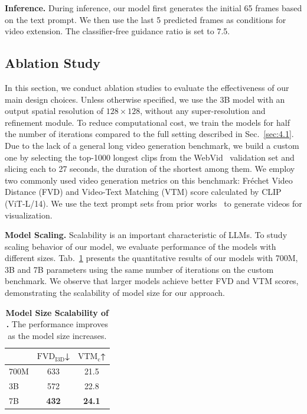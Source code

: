 \textbf{Inference.}
During inference, our model first generates the initial 65 frames based on the text prompt. We then use the last 5 predicted frames as conditions for video extension. The classifier-free guidance ratio is set to 7.5.


\subsection{Ablation Study}
In this section, we conduct ablation studies to evaluate the effectiveness of our main design choices. Unless otherwise specified, we use the 3B model with an output spatial resolution of $128\times 128$, without any super-resolution  and refinement module. To reduce computational cost, we train the models for half the number of iterations compared to the full setting described in Sec.~\ref{sec:4.1}. Due to the lack of a general long video generation benchmark, we build a custom one by selecting the top-1000 longest clips from the WebVid~\cite{Bain21} validation set and slicing each to 27 seconds, the duration of the shortest among them. We employ two commonly used video generation metrics on this benchmark: Fréchet Video Distance (FVD)\cite{unterthiner2018towards} and Video-Text Matching (VTM) score calculated by CLIP (ViT-L/14)\cite{CLIP_paper}. 
We use the text prompt sets from prior works~\cite{bar2024lumiere,girdhar2023emu,imagen_video,make-a-video,openai2024sora} to generate videos for visualization. 

\textbf{Model Scaling.}
Scalability is an important characteristic of LLMs. To study scaling behavior of our model, we evaluate performance of the models with different sizes. Tab.~\ref{tab:scaling} presents the quantitative results of our models with 700M, 3B and 7B parameters using the same number of iterations on the custom benchmark. We observe that larger models achieve better FVD and VTM scores, demonstrating the scalability of model size for our approach.  

\begin{table}
    \vskip -0.2in
    \centering
    \caption{\textbf{Model Size Scalability of \Ours.} 
    The performance improves as the model size increases.
    }
    \begin{tabular}{@{}lcc@{}}
    \toprule
     & $\mathrm{FVD}_{\mathrm{I3D}}$↓  &$\mathrm{VTM}_{\mathrm{c}}$↑\\
    \midrule
    700M & 633 & 21.5 \\
    3B & 572 & 22.8 \\
    7B & \textbf{432} & \textbf{24.1} \\
    \bottomrule
    \end{tabular}
    \label{tab:scaling}
\end{table}




